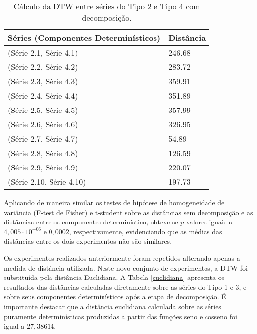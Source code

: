 \begin{table}[!ht]
\centering
\caption{Cálculo da DTW entre séries do Tipo 2 e Tipo 4 com decomposição.}
\begin{tabular}{ll}
 \hline
   Séries (Componentes Determinísticos) & Distância \\
 \hline
(Série 2.1, Série 4.1) & 246.68 \\
(Série 2.2, Série 4.2) & 283.72 \\
(Série 2.3, Série 4.3) & 359.91 \\ 
(Série 2.4, Série 4.4) & 351.89 \\ 
(Série 2.5, Série 4.5) & 357.99 \\
(Série 2.6, Série 4.6) & 326.95 \\ 
(Série 2.7, Série 4.7) & 54.89 \\
(Série 2.8, Série 4.8) & 126.59 \\
(Série 2.9, Série 4.9) & 220.07  \\ 
(Série 2.10, Série 4.10) & 197.73  \\
  \hline
\end{tabular}
\label{dtwcompor2}
\end{table}


Aplicando de maneira similar os testes de hipótese de homogeneidade de variância (F-test de Fisher) e t-student sobre as distâncias sem decomposição e as distâncias entre os componentes determinístico, obteve-se $p$ valores iguais a $4,005 \cdot 10^{-06}$ e $0,0002$, respectivamente, evidenciando que as médias das distâncias entre os dois experimentos não são similares.

Os experimentos realizados anteriormente foram repetidos alterando apenas a medida de distância utilizada. Neste novo conjunto de experimentos, a DTW foi substituída pela distância Euclidiana. A Tabela \ref{euclidiana} apresenta os resultados das distâncias calculadas diretamente sobre as séries do Tipo 1 e 3, e sobre seus componentes determinísticos após a etapa de decomposição. É importante destacar que a distância euclidiana calculada sobre as séries puramente determinísticas produzidas a partir das funções seno e cosseno foi igual a $27,38614$.

